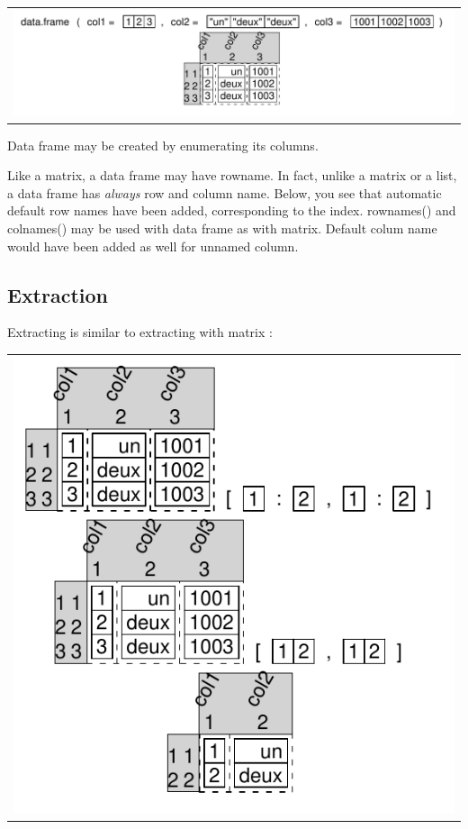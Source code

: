 \documentclass[pdflatex]{article}
\begin{document}
\begin{tabular}{c}
\includegraphics{dataframe.pdf}
\end{tabular}

Data frame may be created by enumerating its columns.

Like a matrix, a data frame may have rowname. In fact, unlike a matrix or a
list, a data frame has \emph{always} row and column name. Below, you see that
automatic default row names have been added, corresponding to the index.
rownames() and colnames() may be used with data frame as with matrix. Default
colum name would have been added as well for unnamed column. 

\subsection{Extraction}

Extracting is similar to extracting with matrix :

\begin{tabular}{c}
\includegraphics{dataframe_extracting.pdf}
\end{tabular}
\end{document}
